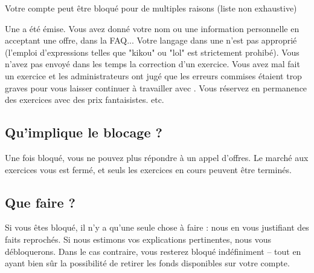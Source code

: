 ﻿Votre compte peut être bloqué pour de multiples raisons (liste non exhaustive)
\begin{itemize}
\li Une  a été émise. Vous avez donné votre nom ou une information personnelle en acceptant une offre, dans la FAQ...
\li Votre langage dans une  n'est pas approprié (l'emploi d'expressions telles que "kikou" ou "lol" est strictement prohibé).
\li Vous n'avez pas envoyé dans les temps la correction d'un exercice.
\li Vous avez mal fait un exercice et les administrateurs ont jugé que les erreurs commises étaient trop graves pour vous laisser continuer à travailler avec \eDevoir.
\li Vous réservez en permanence des exercices avec des prix fantaisistes.
\li etc.
\end{itemize}

\subsection{Qu'implique le blocage ?}
Une fois bloqué, vous ne pouvez plus répondre à un appel d'offres. Le marché aux exercices vous est fermé, et seuls les exercices en cours peuvent être terminés.

\subsection{Que faire ?}
Si vous êtes bloqué, il n'y a qu'une seule chose à faire : nous  en vous justifiant des faits reprochés. Si nous estimons vos explications pertinentes, nous vous débloquerons. Dans le cas contraire, vous resterez bloqué indéfiniment -- tout en ayant bien sûr la possibilité de retirer les fonds disponibles sur votre compte.